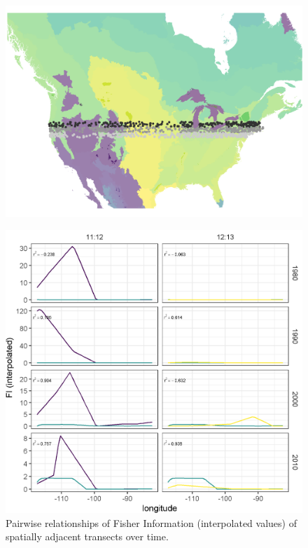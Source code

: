 \documentclass[12pt,twoside,openany]{reedthesis}
\begin{document}
\begin{figure}
\includegraphics[width=0.85\linewidth]{./chapterFiles/fisherSpatial/figures/figsCalledInDiss/allRoutesUsed_ecoregions} \end{figure}
\begin{figure}
\includegraphics[width=0.85\linewidth]{./chapterFiles/fisherSpatial/figures/figsCalledInDiss/interpolated_FI_corplotSelectTransects_East-West} \caption{Pairwise relationships of Fisher Information (interpolated values) of spatially adjacent transects over time. }\label{fig:corPlotTsectsInterp}
\end{figure}
\end{document}
